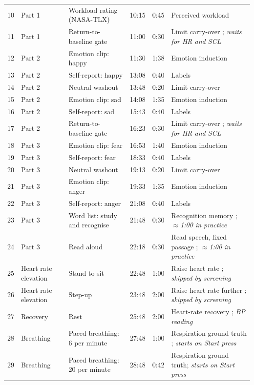 \documentclass[11pt,a4paper]{article}
\begin{document}
{\begin{longtable}{@{}r >{\raggedright\arraybackslash}p{2.3cm} >{\raggedright\arraybackslash}p{4.3cm} r r >{\raggedright\arraybackslash}p{5.4cm}@{}}
10 & Part 1 & Workload rating (NASA-TLX) & 10:15 & 0:45 & Perceived workload \cite{hart1988} \\
11 & Part 1 & Return-to-baseline gate & 11:00 & 0:30 & Limit carry-over \cite{jennings1992}; \textit{waits for HR and SCL} \\
12 & Part 2 & Emotion clip: happy & 11:30 & 1:38 & Emotion induction \\
13 & Part 2 & Self-report: happy & 13:08 & 0:40 & Labels \\
14 & Part 2 & Neutral washout & 13:48 & 0:20 & Limit carry-over \cite{rottenberg2007} \\
15 & Part 2 & Emotion clip: sad & 14:08 & 1:35 & Emotion induction \\
16 & Part 2 & Self-report: sad & 15:43 & 0:40 & Labels \\
17 & Part 2 & Return-to-baseline gate & 16:23 & 0:30 & Limit carry-over \cite{jennings1992}; \textit{waits for HR and SCL} \\
18 & Part 3 & Emotion clip: fear & 16:53 & 1:40 & Emotion induction \\
19 & Part 3 & Self-report: fear & 18:33 & 0:40 & Labels \\
20 & Part 3 & Neutral washout & 19:13 & 0:20 & Limit carry-over \cite{rottenberg2007} \\
21 & Part 3 & Emotion clip: anger & 19:33 & 1:35 & Emotion induction \\
22 & Part 3 & Self-report: anger & 21:08 & 0:40 & Labels \\
23 & Part 3 & Word list: study and recognise & 21:48 & 0:30 & Recognition memory \cite{snodgrass1988}; \textit{$\approx$1:00 in practice} \\
24 & Part 3 & Read aloud & 22:18 & 0:30 & Read speech, fixed passage \cite{brysbaert2019}; \textit{$\approx$1:00 in practice} \\
25 & Heart rate elevation & Stand-to-sit & 22:48 & 1:00 & Raise heart rate \cite{bohannon2019}; \textit{skipped by screening} \\
26 & Heart rate elevation & Step-up & 23:48 & 2:00 & Raise heart rate further \cite{bennett2016}; \textit{skipped by screening} \\
27 & Recovery & Rest & 25:48 & 2:00 & Heart-rate recovery \cite{cole1999,stanley2013}; \textit{BP reading} \\
28 & Breathing & Paced breathing: 6 per minute & 27:48 & 1:00 & Respiration ground truth \cite{lehrer2014}; \textit{starts on Start press} \\
29 & Breathing & Paced breathing: 20 per minute & 28:48 & 0:42 & Respiration ground truth; \textit{starts on Start press} \\

\end{longtable}}
\end{document}
